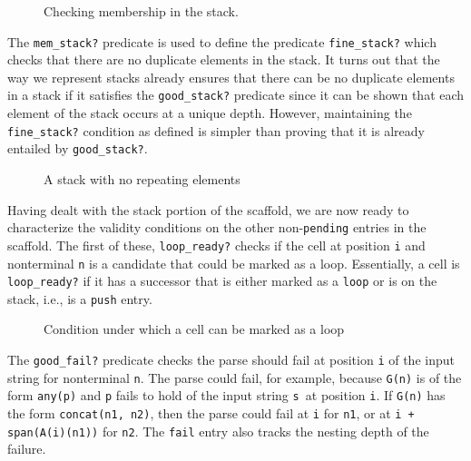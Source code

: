 \documentclass[sigplan,10pt,anonymous,review]{acmart}\settopmatter{printfolios=true,printccs=false,printacmref=false}
\begin{document}
\begin{CCSXML}
\begin{figure}[h!]
			
			\caption{Checking membership in the stack. }
			\label{pvs:memcheck}
\end{figure}

The \texttt{mem\_stack?} predicate is used to define the predicate \texttt{fine\_stack?} which checks that there are no duplicate elements in the stack.   It turns out that the way we represent stacks already ensures that there can be no duplicate elements in a stack if it satisfies the \texttt{good\_stack?} predicate since it can be shown that each element of the stack occurs at a unique depth.  However, maintaining the \texttt{fine\_stack?} condition as defined is simpler than proving that 
it is already entailed by \texttt{good\_stack?}.

\begin{figure}[h!]
			
			\caption{A stack with no repeating elements }
			\label{pvs:finestack}
\end{figure}

Having dealt with the stack portion of the scaffold, we are now ready to characterize the validity conditions on the other non-\texttt{pending} entries in the scaffold.
The first of these, \texttt{loop\_ready?} checks if the cell at position \texttt{i} and nonterminal \texttt{n} is a candidate that could be marked as a loop.
Essentially, a cell is \texttt{loop\_ready?} if it has a successor that
is either marked as a \texttt{loop} or is on the stack, i.e., is a \texttt{push} entry.   
\begin{figure}[h!]
			
			\caption{Condition under which a cell can be marked as a loop}
			\label{pvs:loopready}
                      \end{figure}

                      The \texttt{good\_fail?} predicate checks the parse should fail at position \texttt{i} of the input string for nonterminal \texttt{n}\@.  The parse could fail, for example,  because
                      \texttt{G(n)} is of the form \texttt{any(p)} and \texttt{p} fails to hold of the input string \texttt{s }at position \texttt{i}\@.  If \texttt{G(n)} has the form \texttt{concat(n1, n2)}, then the parse could fail at \texttt{i} for \texttt{n1}, or at \texttt{i + span(A(i)(n1))} for \texttt{n2}\@.  The \texttt{fail} entry also tracks the nesting depth of the failure.  
                      

\end{CCSXML}
\end{document}
